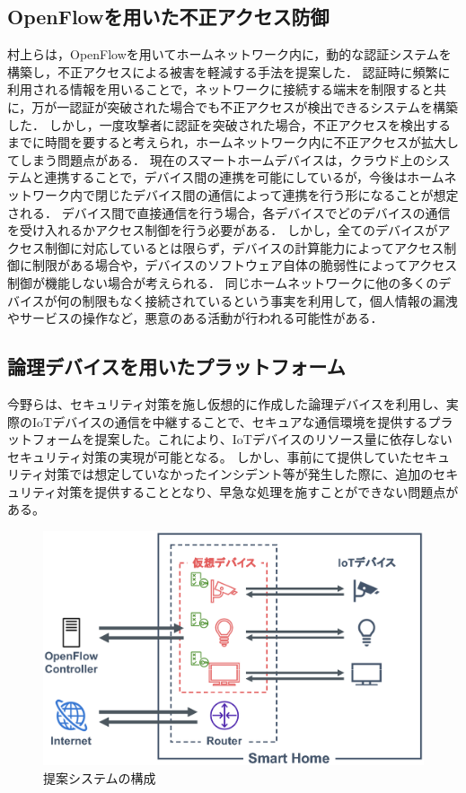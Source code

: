 \documentclass[a4paper,10pt,twocolumn,uplatex]{jsarticle}
\begin{document}
\subsection{OpenFlowを用いた不正アクセス防御}
村上らは，OpenFlowを用いてホームネットワーク内に，動的な認証システムを構築し，不正アクセスによる被害を軽減する手法を提案した\cite{related}．
認証時に頻繁に利用される情報を用いることで，ネットワークに接続する端末を制限すると共に，万が一認証が突破された場合でも不正アクセスが検出できるシステムを構築した．
しかし，一度攻撃者に認証を突破された場合，不正アクセスを検出するまでに時間を要すると考えられ，ホームネットワーク内に不正アクセスが拡大してしまう問題点がある．
現在のスマートホームデバイスは，クラウド上のシステムと連携することで，デバイス間の連携を可能にしているが，今後はホームネットワーク内で閉じたデバイス間の通信によって連携を行う形になることが想定される\cite{d2d}．
デバイス間で直接通信を行う場合，各デバイスでどのデバイスの通信を受け入れるかアクセス制御を行う必要がある．
しかし，全てのデバイスがアクセス制御に対応しているとは限らず，デバイスの計算能力によってアクセス制御に制限がある場合や，デバイスのソフトウェア自体の脆弱性によってアクセス制御が機能しない場合が考えられる．
同じホームネットワークに他の多くのデバイスが何の制限もなく接続されているという事実を利用して，個人情報の漏洩やサービスの操作など，悪意のある活動が行われる可能性がある\cite{disap}．

\subsection{論理デバイスを用いたプラットフォーム}
今野らは、セキュリティ対策を施し仮想的に作成した論理デバイスを利用し、実際のIoTデバイスの通信を中継することで、セキュアな通信環境を提供するプラットフォームを提案した。これにより、IoTデバイスのリソース量に依存しないセキュリティ対策の実現が可能となる。
しかし、事前にて提供していたセキュリティ対策では想定していなかったインシデント等が発生した際に、追加のセキュリティ対策を提供することとなり、早急な処理を施すことができない問題点がある。

\begin{figure}[!tb]
  \centering
  \includegraphics[width=\linewidth]{img/architecture.eps}
  \caption{提案システムの構成}
  \label{fig:architecture}
\end{figure}
\end{document}
